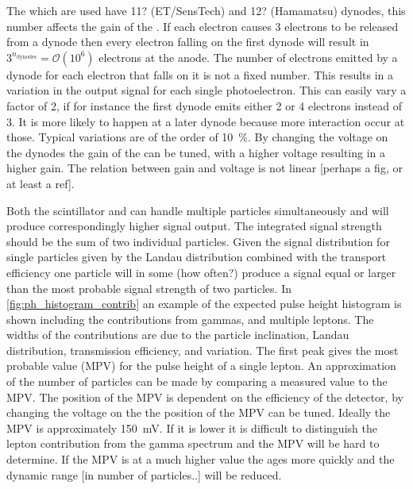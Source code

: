 The \pmts which are used have 11? (ET/SensTech) and 12? (Hamamatsu) dynodes, this number affects the gain of the \pmt. If each electron causes \num{3} electrons to be released from a dynode then every electron falling on the first dynode will result in $3^{n_{\mathrm{dynodes}}} = \mathcal{O}(10^6)$ electrons at the anode. The number of electrons emitted by a dynode for each electron that falls on it is not a fixed number. This results in a variation in the output signal for each single photoelectron. This can easily vary a factor of 2, if for instance the first dynode emits either 2 or 4 electrons instead of 3. It is more likely to happen at a later dynode because more interaction occur at those. Typical variations are of the order of \SI{10}{\percent}. By changing the voltage on the dynodes the gain of the \pmt can be tuned, with a higher voltage resulting in a higher gain. The relation between gain and voltage is not linear [perhaps a fig, or at least a ref]. 

Both the scintillator and \pmt can handle multiple particles simultaneously and will produce correspondingly higher signal output. The integrated signal strength should be the sum of two individual particles. Given the signal distribution for single particles given by the Landau distribution combined with the transport efficiency one particle will in some (how often?) produce a signal equal or larger than the most probable signal strength of two particles. In \cref{fig:ph_histogram_contrib} an example of the expected pulse height histogram is shown including the contributions from gammas, and multiple leptons. The widths of the contributions are due to the particle inclination, Landau distribution, transmission efficiency, and \pmt variation. The first peak gives the most probable value (MPV) for the pulse height of a single lepton. An approximation of the number of particles can be made by comparing a measured value to the MPV. The position of the MPV is dependent on the efficiency of the detector, by changing the voltage on the \pmt the position of the MPV can be tuned. Ideally the MPV is approximately \SI{150}{\mV}. If it is lower it is difficult to distinguish the lepton contribution from the gamma spectrum and the MPV will be hard to determine. If the MPV is at a much higher value the \pmt ages more quickly and the dynamic range [in number of particles..] will be reduced.

